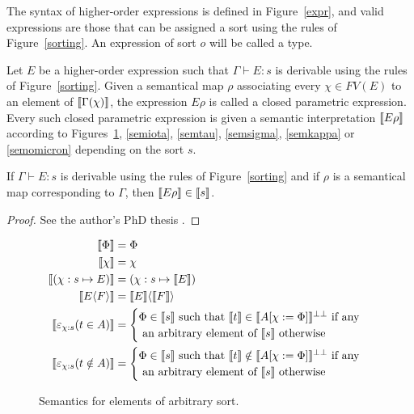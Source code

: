 \begin{definition}
  The syntax of higher-order expressions is defined in Figure~\ref{expr},
  and valid expressions are those that can be assigned a sort using the
  rules of Figure~\ref{sorting}. An expression of sort $o$ will be called
  a type.
\end{definition}

\begin{definition}
  Let $E$ be a higher-order expression such that $\Gamma \vdash E : s$ is
  derivable using the rules of Figure~\ref{sorting}. Given a semantical
  map $\rho$ associating every $\chi \in FV(E)$ to an element of
  $\llbracket \Gamma(\chi) \rrbracket$, the expression $E\rho$ is called
  a closed parametric expression. Every such closed parametric expression is
  given a semantic interpretation $\llbracket E\rho \rrbracket$ according to
  Figures~\ref{semany}, \ref{semiota}, \ref{semtau}, \ref{semsigma},
  \ref{semkappa} or \ref{semomicron} depending on the sort $s$.
\end{definition}

\begin{lemma}
  If $\Gamma \vdash E : s$ is derivable using the rules of
  Figure~\ref{sorting} and if $\rho$ is a semantical map corresponding to
  $\Gamma$, then $\llbracket E\rho \rrbracket \in \llbracket s \rrbracket$.
\end{lemma}
\begin{proof}
  See the author's PhD thesis \cite[Chapter~4]{Lepigre2017PhD}.
\end{proof}

\begin{figure}
  \begin{align*}
    \llbracket \Phi \rrbracket &= \Phi\\
    \llbracket \chi \rrbracket &= \chi\\
    \llbracket (\chi:s \mapsto E) \rrbracket
      &= (\chi:s \mapsto \llbracket E \rrbracket)\\
    \llbracket E\langle F \rangle \rrbracket
      &= \llbracket E \rrbracket \langle \llbracket F \rrbracket \rangle\\
    \llbracket \varepsilon_{\chi:s}(t \in A) \rrbracket
      &= \begin{cases}
           \Phi \in \llbracket s \rrbracket \text{ such that }
             \llbracket t \rrbracket \in \llbracket A[\chi := \Phi]
             \rrbracket^{\bot\bot} \text{ if any}\\
           \text{ an arbitrary element of } \llbracket s \rrbracket
             \text { otherwise}
         \end{cases}\\
    \llbracket \varepsilon_{\chi:s}(t \notin A) \rrbracket
      &= \begin{cases}
           \Phi \in \llbracket s \rrbracket \text{ such that }
             \llbracket t \rrbracket \notin \llbracket A[\chi := \Phi]
             \rrbracket^{\bot\bot} \text{ if any}\\
           \text{ an arbitrary element of } \llbracket s \rrbracket
             \text { otherwise}
         \end{cases}
  \end{align*}
  \caption{Semantics for elements of arbitrary sort.}\label{semany}
\end{figure}

